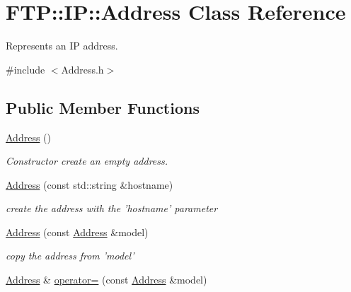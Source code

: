 \hypertarget{class_f_t_p_1_1_i_p_1_1_address}{\section{F\-T\-P\-:\-:I\-P\-:\-:Address Class Reference}
\label{class_f_t_p_1_1_i_p_1_1_address}
}


Represents an I\-P address.  




{\ttfamily \#include $<$Address.\-h$>$}

\subsection*{Public Member Functions}
\begin{DoxyCompactItemize}
\item 
\hypertarget{class_f_t_p_1_1_i_p_1_1_address_a43b4fdcaeea7feec12c8c39018a2c426}{\hyperlink{class_f_t_p_1_1_i_p_1_1_address_a43b4fdcaeea7feec12c8c39018a2c426}{Address} ()}\label{class_f_t_p_1_1_i_p_1_1_address_a43b4fdcaeea7feec12c8c39018a2c426}

\begin{DoxyCompactList}\small\item\em Constructor create an empty address. \end{DoxyCompactList}\item 
\hyperlink{class_f_t_p_1_1_i_p_1_1_address_a6d18d47e09493c961921214e24bf5a16}{Address} (const std\-::string \&hostname)
\begin{DoxyCompactList}\small\item\em create the address with the 'hostname' parameter \end{DoxyCompactList}\item 
\hypertarget{class_f_t_p_1_1_i_p_1_1_address_ac22351617c160051333e8d3dbb29ca18}{\hyperlink{class_f_t_p_1_1_i_p_1_1_address_ac22351617c160051333e8d3dbb29ca18}{Address} (const \hyperlink{class_f_t_p_1_1_i_p_1_1_address}{Address} \&model)}\label{class_f_t_p_1_1_i_p_1_1_address_ac22351617c160051333e8d3dbb29ca18}

\begin{DoxyCompactList}\small\item\em copy the address from 'model' \end{DoxyCompactList}\item 
\hypertarget{class_f_t_p_1_1_i_p_1_1_address_a0523601625aea2ae8b5c63d367abf1fd}{\hyperlink{class_f_t_p_1_1_i_p_1_1_address}{Address} \& \hyperlink{class_f_t_p_1_1_i_p_1_1_address_a0523601625aea2ae8b5c63d367abf1fd}{operator=} (const \hyperlink{class_f_t_p_1_1_i_p_1_1_address}{Address} \&model)}\label{class_f_t_p_1_1_i_p_1_1_address_a0523601625aea2ae8b5c63d367abf1fd}


\end{DoxyCompactItemize}
